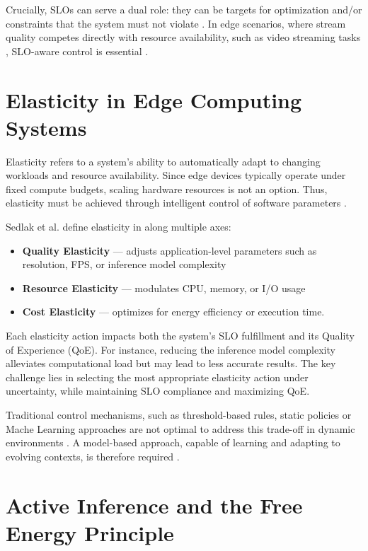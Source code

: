 Crucially, SLOs can serve a dual role: they can be targets for optimization and/or constraints that the
system must not violate \cite{casamayor_pujol_deepslos_2024, sedlak_diffusing_2024}. In edge scenarios, where stream quality competes directly with resource availability, such as video streaming tasks \cite{sedlak_adaptive_2024}, SLO-aware control is essential \cite{sedlak_slo-aware_2025}.

\section{Elasticity in Edge Computing Systems}
Elasticity refers to a system’s ability to automatically adapt to changing workloads and resource availability. Since edge devices typically operate under fixed compute budgets, scaling hardware resources is not an option. Thus, elasticity must be achieved through intelligent control of software parameters \cite{sedlak_towards_2025}.

Sedlak et al. define elasticity in \cite{sedlak_towards_2025} along multiple axes:
\begin{itemize}
  \item \textbf{Quality Elasticity} — adjusts application-level parameters such as resolution, FPS,
or inference model complexity
  \item \textbf{Resource Elasticity} — modulates CPU, memory, or I/O usage
  \item \textbf{Cost Elasticity} — optimizes for energy efficiency or execution time.
\end{itemize}

Each elasticity action impacts both the system's SLO fulfillment and its Quality of Experience
(QoE). For instance, reducing the inference model complexity alleviates computational load but may lead to less accurate results. The key challenge lies in selecting the most appropriate elasticity action under uncertainty, while maintaining SLO compliance and maximizing QoE.

Traditional control mechanisms, such as threshold-based rules, static policies or Mache Learning approaches are not optimal to address this trade-off in dynamic environments \cite{sedlak_active_2024}. A model-based approach, capable of learning and adapting to evolving contexts, is therefore required \cite{sedlak_equilibrium_2024, danilenka_adaptive_2025}.

\section{Active Inference and the Free Energy Principle}
